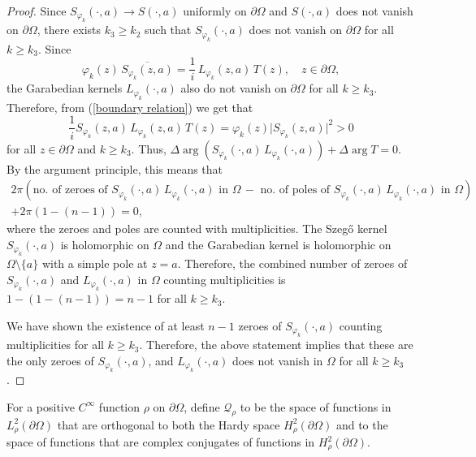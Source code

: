 \documentclass[11pt, reqno]{amsart}
\numberwithin{equation}{section}
\begin{document}
\begin{proof}
Since $S_{\varphi_k}(\cdot,a)\rightarrow S(\cdot,a)$ uniformly on $\partial\Omega$ and $S(\cdot,a)$ does not vanish on $\partial\Omega$, there exists $k_3\geq k_2$ such that $S_{\varphi_k}(\cdot,a)$ does not vanish on $\partial\Omega$ for all $k\geq k_3$. Since
\begin{equation}\label{boundary relation}
\varphi_k(z)\,\overline{S_{\varphi_k}(z,a)}=\frac{1}{i} \,L_{\varphi_k}(z,a)\, T(z),\quad z\in\partial\Omega,
\end{equation}
the Garabedian kernels $L_{\varphi_k}(\cdot,a)$ also do not vanish on $\partial\Omega$ for all $k\geq k_3$. Therefore, from (\ref{boundary relation}) we get that
\[
\frac{1}{i} S_{\varphi_k}(z,a) \,L_{\varphi_k}(z,a)\, T(z) = \varphi_k(z) \vert S_{\varphi_k}(z,a)\vert^2 > 0 
\]
for all $z\in \partial\Omega$ and $k\geq k_3$.
Thus, $\Delta \arg (S_{\varphi_k}(\cdot,a)\,L_{\varphi_k}(\cdot,a)) + \Delta \arg T =0$. By the argument principle, this means that
\begin{multline}
2\pi \left( \text{no. of zeroes of } S_{\varphi_k}(\cdot,a)\,L_{\varphi_k}(\cdot,a) \text{ in }\Omega\, 
-
\text{ no. of poles of } S_{\varphi_k}(\cdot,a)\,L_{\varphi_k}(\cdot,a) \text{ in } \Omega \right) \\
+ 2\pi(1 - (n-1)) =0,
\end{multline}
where the zeroes and poles are counted with multiplicities. The Szeg\H{o} kernel $S_{\varphi_k}(\cdot,a)$ is holomorphic on $\Omega$ and the Garabedian kernel is holomorphic on $\Omega\setminus\{a\}$ with a simple pole at $z=a$. Therefore, the combined number of zeroes of $S_{\varphi_k}(\cdot,a)$ and $L_{\varphi_k}(\cdot,a)$ in $\Omega$ counting multiplicities is $1-(1-(n-1))=n-1$ for all $k\geq k_3$.

\medskip

We have shown the existence of at least $n-1$ zeroes of $S_{\varphi_k}(\cdot,a)$ counting multiplicities for all $k\geq k_3$. Therefore, the above statement implies that these are the only zeroes of $S_{\varphi_k}(\cdot,a)$, and $L_{\varphi_k}(\cdot, a)$ does not vanish in $\Omega$ for all $k\geq k_3$. 
\end{proof}

For a positive $C^{\infty}$ function $\rho$ on $\partial\Omega$, define $\mathcal{Q}_{\rho}$ to be the space of functions in $L^2_{\rho}(\partial\Omega)$ that are orthogonal to both the Hardy space $H^2_{\rho}(\partial\Omega)$ and to the space of functions that are complex conjugates of functions in $H^2_{\rho}(\partial\Omega)$. 
\end{document}
